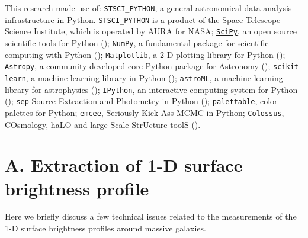 \documentclass[a4paper,fleqn,usenatbib]{mnras}
\begin{document}
  This research made use of:
  \href{http://www.stsci.edu/institute/software_hardware/pyraf/stsci\_python}{\texttt{STSCI\_PYTHON}},
      a general astronomical data analysis infrastructure in Python. 
      \texttt{STSCI\_PYTHON} is a product of the Space Telescope Science Institute, 
      which is operated by AURA for NASA;
  \href{http://www.scipy.org/}{\texttt{SciPy}},
      an open source scientific tools for Python (\citealt{SciPy});
  \href{http://www.numpy.org/}{\texttt{NumPy}}, 
      a fundamental package for scientific computing with Python (\citealt{NumPy});
  \href{http://matplotlib.org/}{\texttt{Matplotlib}}, 
      a 2-D plotting library for Python (\citealt{Matplotlib});
  \href{http://www.astropy.org/}{\texttt{Astropy}}, a community-developed 
      core Python package for Astronomy (\citealt{AstroPy}); 
  \href{http://scikit-learn.org/stable/index.html}{\texttt{scikit-learn}},
      a machine-learning library in Python (\citealt{scikit-learn}); 
  \href{http://www.astroml.org/}{\texttt{astroML}}, 
      a machine learning library for astrophysics (\citealt{astroML});
  \href{https://ipython.org}{\texttt{IPython}}, 
      an interactive computing system for Python (\citealt{IPython});
  \href{https://github.com/kbarbary/sep}{\texttt{sep}} 
      Source Extraction and Photometry in Python (\citealt{PythonSEP});
  \href{https://jiffyclub.github.io/palettable/}{\texttt{palettable}},
      color palettes for Python;
  \href{http://dan.iel.fm/emcee/current/}{\texttt{emcee}}, 
      Seriously Kick-Ass MCMC in Python;
  \href{http://bdiemer.bitbucket.org/}{\texttt{Colossus}}, 
      COsmology, haLO and large-Scale StrUcture toolS (\citealt{Colossus}).






\appendix
    
\section{A. Extraction of 1-D surface brightness profile} 
    \label{app:ellipse} 
    
    Here we briefly discuss a few technical issues related to the measurements of the 
    1-D surface brightness profiles around massive galaxies. 
    
\end{document}
